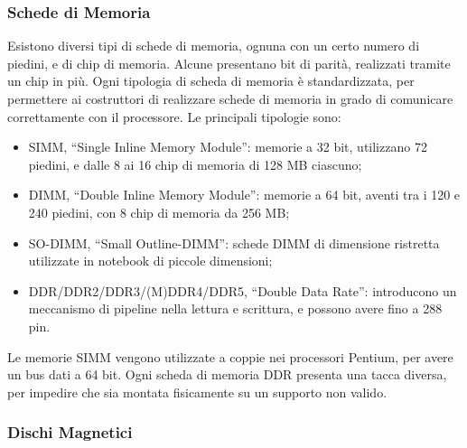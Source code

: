 \documentclass{article}
\numberwithin{equation}{subsection}
\begin{document}
\subsubsection{Schede di Memoria}

Esistono diversi tipi di schede di memoria, ognuna con un certo numero di piedini, e di chip di memoria. Alcune presentano bit di parità, realizzati tramite un chip in più. 
Ogni tipologia di scheda di memoria è standardizzata, per permettere ai costruttori di realizzare schede di memoria in grado di comunicare correttamente con il processore. 
Le principali tipologie sono:
\begin{itemize}
    \item SIMM, ``Single Inline Memory Module'': memorie a 32 bit, utilizzano 72 piedini, e dalle 8 ai 16 chip di memoria di 128 MB ciascuno;
    \item DIMM, ``Double Inline Memory Module'': memorie a 64 bit, aventi tra i 120 e 240 piedini, con 8 chip di memoria da 256 MB;
    \item SO-DIMM, ``Small Outline-DIMM'': schede DIMM di dimensione ristretta utilizzate in notebook di piccole dimensioni;
    \item DDR/DDR2/DDR3/(M)DDR4/DDR5, ``Double Data Rate'': introducono un meccanismo di pipeline nella lettura e scrittura, e possono avere fino a 288 pin. 
\end{itemize}
Le memorie SIMM vengono utilizzate a coppie nei processori Pentium, per avere un bus dati a 64 bit. 
Ogni scheda di memoria DDR presenta una tacca diversa, per impedire che sia montata fisicamente su un supporto non valido. 

\subsubsection{Dischi Magnetici}
\end{document}
